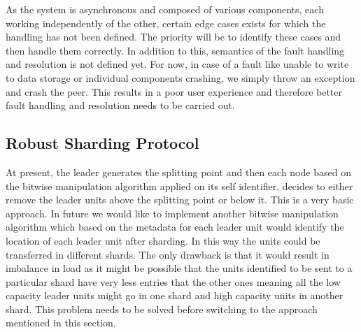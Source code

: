 \documentclass[a4paper,11pt]{kth-mag}
\begin{document}
As the system is asynchronous and composed of various components, each working independently of the other, certain edge cases exists for which the handling has not been defined. The priority will be to identify these cases and then handle them correctly. In addition to this, semantics of the fault handling and resolution is not defined yet. For now, in case of a fault like unable to write to data storage or individual components crashing, we simply throw an exception and crash the peer. This results in a poor user experience and therefore better fault handling and resolution needs to be carried out.


\subsection{Robust Sharding Protocol}
At present, the leader generates the splitting point and then each node based on the bitwise manipulation algorithm applied on its self identifier, decides to either remove the leader units above the splitting point or below it. This is a very basic approach. In future we would like to implement another bitwise manipulation algorithm which based on the metadata for each leader unit would identify the location of each leader unit after sharding. In this way the units could be transferred in different shards. The only drawback is that it would result in imbalance in load as it might be possible that the units identified to be sent to a particular shard have very less entries that the other ones meaning all the low capacity leader units might go in one shard and high capacity units in another shard. This problem needs to be solved before switching to the approach mentioned in this section.






\appendix

\end{document}
